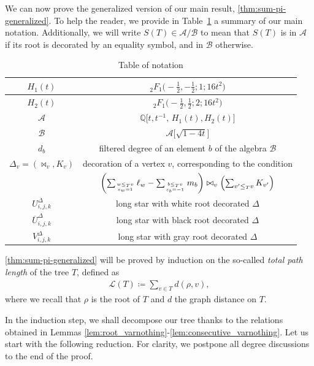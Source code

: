 \documentclass[12pt]{amsart}
\newcommand{\revision}[1]{{#1}}
\theoremstyle{plain}
\theoremstyle{remark}
\def\eps{\varepsilon}
\def\Q{\mathbb{Q}}
\def\cL{\mathcal{L}}
\def\Q{\mathbb{Q}}
\def\cA{\mathcal{A}}
\def\cB{\mathcal{B}}
\begin{document}
We can now prove the generalized version of our main result, \cref{thm:sum-pi-generalized}. \revision{To help the reader, we provide in Table~\ref{table:notation} a
summary of our main notation.}
Additionally, we will write $S(T) \in \cA/\cB$ to mean that $S(T)$ is in $\cA$ if its root is decorated by an equality symbol, and in $\cB$ otherwise.
\begin{table}
\begin{center}
\begin{tabular}{|c|c|}
\hline
$H_1(t)$ & ${}_{2}^{}{{}{{}{F_{1}^{}}}}\big(-\tfrac12,-\tfrac12; 1;16t^2\big)$\\
\hline
$H_2(t)$ & ${}_{2}^{}{{}{{}{F_{1}^{}}}}\big(-\tfrac12,\tfrac12; 2;16t^2\big)$\\
\hline
$\cA$ & $\Q\Big[t,t^{-1}, \, H_1(t), H_2(t) \Big]$\\
\hline
$\cB$ & $\cA\Big[\sqrt{1-4t} \Big]$\\
\hline
$d_b$ & filtered degree of an element $b$ of the algebra $\cB$\\
\hline
$\Delta_v=(\bowtie_v,K_v)$ & decoration of a vertex $v$, corresponding to the condition\\
&$\left(\sum_{w \le_T v \atop \eps_w=1} \ell_w -  \sum_{b \le_T v \atop \eps_b=-1} m_b \right) \bowtie_v \left( \sum_{v' \le_T v} K_{v'} \right)$\\
\hline
$U^\Delta_{i,j,k}$ & long star with white root decorated $\Delta$\\
\hline
$\overline{U}^\Delta_{i,j,k}$ & long star with black root decorated $\Delta$\\
\hline
$V^\Delta_{i,j,k}$ & long star with gray root decorated $\Delta$\\
\hline
\end{tabular}\smallskip
\end{center}
\caption{Table of notation\label{table:notation}}
\end{table}


\cref{thm:sum-pi-generalized} will be proved by induction on the so-called \emph{total path length} of the tree $T$, defined as 
\begin{align*}
\cL(T) \coloneqq  \sum_{v \in T} d(\rho, v),
\end{align*}
where we recall that $\rho$ is the root of $T$ and $d$ the graph distance on $T$.

In the induction step, we shall decompose our tree thanks to the relations obtained in Lemmas \ref{lem:root_varnothing}-\ref{lem:consecutive_varnothing}. Let us start with the following reduction. For clarity, we postpone all degree discussions to the end of the proof.
\end{document}
